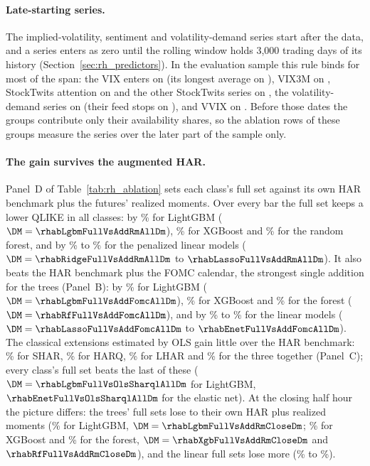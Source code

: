 \paragraph{Late-starting series.}  The implied-volatility, sentiment and volatility-demand series start after the
data, and a series enters as zero until the rolling window holds 3,000 trading days of its history
(Section~\ref{sec:rh_predictors}).  In the evaluation sample this rule binds for most of the span: the VIX enters on
\rhabLiveVixFromKone{} (its longest average on \rhabLiveVixFromKlast{}), VIX3M on \rhabLiveVixthreemFromKone{},
StockTwits attention on \rhabLiveAttnFromKone{} and the other StockTwits series on \rhabLiveSentFromKone{}, the
volatility-demand series on \rhabLiveVdSpxOcFromKone{} (their feed stops on \rhabLiveVdSpxOcLast{}),
and VVIX on \rhabLiveVvixFromKone{}.  Before those dates the groups contribute only their availability shares, so
the ablation rows of these groups measure the series over the later part of the sample only.

\paragraph{The gain survives the augmented HAR.}  Panel~D of Table~\ref{tab:rh_ablation} sets each class's full set
against its own HAR benchmark plus the futures' realized moments.  Over every bar the full set keeps a lower QLIKE in
all \rhabNClassesBeatAddRm{} classes: by \rhabLgbmFullVsAddRmAllPct\% for LightGBM ($\DM = \rhabLgbmFullVsAddRmAllDm$),
\rhabXgbFullVsAddRmAllPct\% for XGBoost and \rhabRfFullVsAddRmAllPct\% for the random forest, and by
\rhabRidgeFullVsAddRmAllPct\% to \rhabLassoFullVsAddRmAllPct\% for the penalized linear models
($\DM = \rhabRidgeFullVsAddRmAllDm$ to $\rhabLassoFullVsAddRmAllDm$).  It also beats the HAR benchmark plus the FOMC
calendar, the strongest single addition for the trees (Panel~B): by \rhabLgbmFullVsAddFomcAllPct\% for LightGBM
($\DM = \rhabLgbmFullVsAddFomcAllDm$), \rhabXgbFullVsAddFomcAllPct\% for XGBoost and \rhabRfFullVsAddFomcAllPct\% for the
forest ($\DM = \rhabRfFullVsAddFomcAllDm$), and by \rhabRidgeFullVsAddFomcAllPct\% to \rhabEnetFullVsAddFomcAllPct\% for
the linear models ($\DM = \rhabLassoFullVsAddFomcAllDm$ to $\rhabEnetFullVsAddFomcAllDm$).  The classical extensions estimated by OLS gain little
over the HAR benchmark: \rhabOlsSharAllPct\% for SHAR, \rhabOlsHarqAllPct\% for HARQ, \rhabOlsLharAllPct\% for LHAR and
\rhabOlsSharqlAllPct\% for the three together (Panel~C); every class's full set beats the last of these
($\DM = \rhabLgbmFullVsOlsSharqlAllDm$ for LightGBM, $\rhabEnetFullVsOlsSharqlAllDm$ for the elastic net).  At the closing
half hour the picture differs: the trees' full sets lose to their own HAR plus realized moments
(\rhabLgbmFullVsAddRmClosePct\% for LightGBM, $\DM = \rhabLgbmFullVsAddRmCloseDm$; \rhabXgbFullVsAddRmClosePct\% for
XGBoost and \rhabRfFullVsAddRmClosePct\% for the forest, $\DM = \rhabXgbFullVsAddRmCloseDm$ and
$\rhabRfFullVsAddRmCloseDm$), and the linear full sets lose more (\rhabEnetFullVsAddRmClosePct\% to
\rhabLassoFullVsAddRmClosePct\%).

